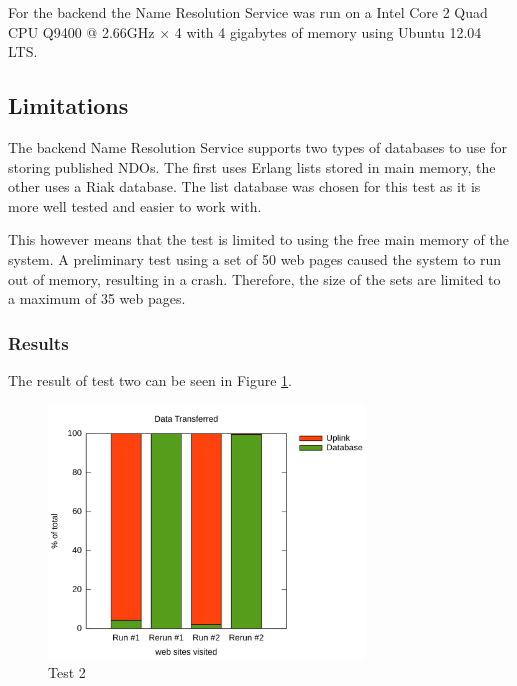 For the backend the Name Resolution Service was run on a Intel Core 2 Quad CPU Q9400 @ 2.66GHz × 4 with 4 gigabytes of memory using Ubuntu 12.04 LTS.

\subsection{Limitations}

The backend Name Resolution Service supports two types of databases to use for storing published NDOs. The first uses Erlang lists stored in main memory, the other uses a Riak database. The list database was chosen for this test as it is more well tested and easier to work with.

This however means that the test is limited to using the free main memory of the system. A preliminary test using a set of 50 web pages caused the system to run out of memory, resulting in a crash. Therefore, the size of the sets are limited to a maximum of 35 web pages.

\subsubsection{Results}




The result of test two can be seen in Figure \ref{fig:frontendtest2}.

\begin{figure}
	\centering
		\includegraphics[width=0.75\textwidth]{./img/rerun.svg}
    	\caption{Test 2}
	\label{fig:frontendtest2}
\end{figure}

